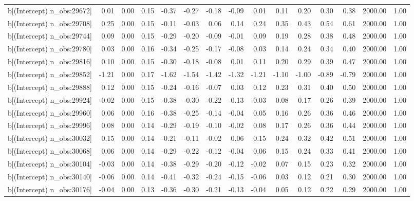 \begin{table}[ht]
\begin{tabular}{rrrrrrrrrrrrrrr}
  b[(Intercept) n\_obs:29672] & 0.01 & 0.00 & 0.15 & -0.37 & -0.27 & -0.18 & -0.09 & 0.01 & 0.11 & 0.20 & 0.30 & 0.38 & 2000.00 & 1.00 \\ 
  b[(Intercept) n\_obs:29708] & 0.25 & 0.00 & 0.15 & -0.11 & -0.03 & 0.06 & 0.14 & 0.24 & 0.35 & 0.43 & 0.54 & 0.61 & 2000.00 & 1.00 \\ 
  b[(Intercept) n\_obs:29744] & 0.09 & 0.00 & 0.15 & -0.29 & -0.20 & -0.09 & -0.01 & 0.09 & 0.19 & 0.28 & 0.38 & 0.48 & 2000.00 & 1.00 \\ 
  b[(Intercept) n\_obs:29780] & 0.03 & 0.00 & 0.16 & -0.34 & -0.25 & -0.17 & -0.08 & 0.03 & 0.14 & 0.24 & 0.34 & 0.40 & 2000.00 & 1.00 \\ 
  b[(Intercept) n\_obs:29816] & 0.10 & 0.00 & 0.15 & -0.30 & -0.18 & -0.08 & 0.01 & 0.11 & 0.20 & 0.29 & 0.39 & 0.47 & 2000.00 & 1.00 \\ 
  b[(Intercept) n\_obs:29852] & -1.21 & 0.00 & 0.17 & -1.62 & -1.54 & -1.42 & -1.32 & -1.21 & -1.10 & -1.00 & -0.89 & -0.79 & 2000.00 & 1.00 \\ 
  b[(Intercept) n\_obs:29888] & 0.12 & 0.00 & 0.15 & -0.24 & -0.16 & -0.07 & 0.03 & 0.12 & 0.23 & 0.31 & 0.40 & 0.50 & 2000.00 & 1.00 \\ 
  b[(Intercept) n\_obs:29924] & -0.02 & 0.00 & 0.15 & -0.38 & -0.30 & -0.22 & -0.13 & -0.03 & 0.08 & 0.17 & 0.26 & 0.39 & 2000.00 & 1.00 \\ 
  b[(Intercept) n\_obs:29960] & 0.06 & 0.00 & 0.16 & -0.38 & -0.25 & -0.14 & -0.04 & 0.05 & 0.16 & 0.26 & 0.36 & 0.46 & 2000.00 & 1.00 \\ 
  b[(Intercept) n\_obs:29996] & 0.08 & 0.00 & 0.14 & -0.29 & -0.19 & -0.10 & -0.02 & 0.08 & 0.17 & 0.26 & 0.36 & 0.44 & 2000.00 & 1.00 \\ 
  b[(Intercept) n\_obs:30032] & 0.15 & 0.00 & 0.14 & -0.21 & -0.11 & -0.02 & 0.06 & 0.15 & 0.24 & 0.32 & 0.42 & 0.51 & 2000.00 & 1.00 \\ 
  b[(Intercept) n\_obs:30068] & 0.06 & 0.00 & 0.14 & -0.29 & -0.22 & -0.12 & -0.04 & 0.06 & 0.15 & 0.24 & 0.33 & 0.41 & 2000.00 & 1.00 \\ 
  b[(Intercept) n\_obs:30104] & -0.03 & 0.00 & 0.14 & -0.38 & -0.29 & -0.20 & -0.12 & -0.02 & 0.07 & 0.15 & 0.23 & 0.32 & 2000.00 & 1.00 \\ 
  b[(Intercept) n\_obs:30140] & -0.06 & 0.00 & 0.14 & -0.41 & -0.32 & -0.24 & -0.15 & -0.06 & 0.03 & 0.12 & 0.21 & 0.30 & 2000.00 & 1.00 \\ 
  b[(Intercept) n\_obs:30176] & -0.04 & 0.00 & 0.13 & -0.36 & -0.30 & -0.21 & -0.13 & -0.04 & 0.05 & 0.12 & 0.22 & 0.29 & 2000.00 & 1.00 \\ 

\end{tabular}
\end{table}
